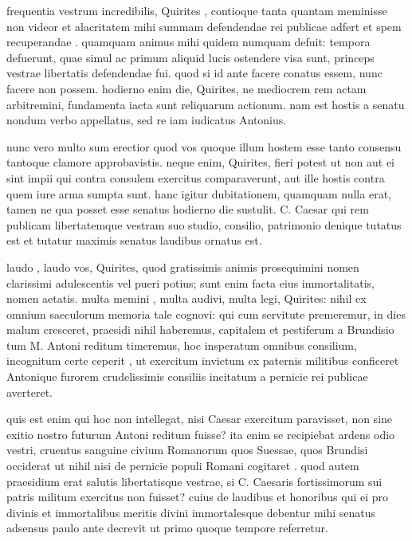 
 frequentia vestrum incredibilis, Quirites , contioque tanta quantam meminisse non videor et alacritatem mihi summam defendendae rei publicae adfert et spem recuperandae . quamquam animus mihi quidem numquam defuit: tempora defuerunt, quae simul ac primum aliquid lucis ostendere visa sunt, princeps vestrae libertatis defendendae fui. quod si id ante facere conatus essem, nunc facere non possem. hodierno enim die, Quirites, ne mediocrem rem actam arbitremini, fundamenta iacta sunt reliquarum actionum. nam est hostis a senatu nondum verbo appellatus, sed re iam iudicatus Antonius.

 nunc vero multo sum erectior quod vos quoque illum hostem esse tanto consensu tantoque clamore approbavistis. neque enim, Quirites, fieri potest ut non aut ei sint impii qui contra consulem exercitus comparaverunt, aut ille hostis contra quem iure arma sumpta sunt. hanc igitur dubitationem, quamquam nulla erat, tamen ne qua posset esse senatus hodierno die sustulit. C. Caesar qui rem publicam libertatemque vestram suo studio, consilio, patrimonio denique tutatus est et tutatur maximis senatus laudibus ornatus est.

 laudo , laudo vos, Quirites, quod gratissimis animis prosequimini nomen clarissimi adulescentis vel pueri potius; sunt enim facta eius immortalitatis, nomen aetatis. multa memini , multa audivi, multa legi, Quirites: nihil ex omnium saeculorum memoria tale cognovi: qui cum servitute premeremur, in dies malum cresceret, praesidi nihil haberemus, capitalem et pestiferum a Brundisio tum M. Antoni reditum timeremus, hoc insperatum omnibus consilium, incognitum certe ceperit , ut exercitum invictum ex paternis militibus conficeret Antonique furorem crudelissimis consiliis incitatum a pernicie rei publicae averteret.

 quis est enim qui hoc non intellegat, nisi Caesar exercitum paravisset, non sine exitio nostro futurum Antoni reditum fuisse? ita enim se recipiebat ardens odio vestri, cruentus sanguine civium Romanorum quos Suessae, quos Brundisi occiderat ut nihil nisi de pernicie populi Romani cogitaret . quod autem praesidium erat salutis libertatisque vestrae, si C. Caesaris fortissimorum sui patris militum exercitus non fuisset? cuius de laudibus et honoribus qui ei pro divinis et immortalibus meritis divini immortalesque debentur mihi senatus adsensus paulo ante decrevit ut primo quoque tempore referretur.

